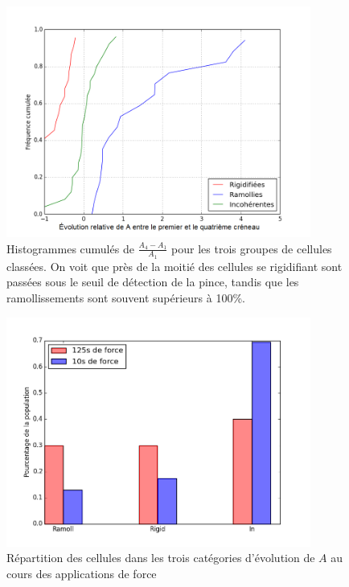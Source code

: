 \documentclass                                                                                                                                                                                                                                                                                                                                       {report}
\begin{document}
\begin{figure}[p]
\includegraphics[width=10cm]{Figures/Evolution_J4-J0_sur_J0.png} 
\caption{Histogrammes cumulés de $\frac{A_4-A_1}{A_1}$ pour les trois groupes de cellules classées. On voit que près de la moitié des cellules se rigidifiant sont passées sous le seuil de détection de la pince, tandis que les ramollissements sont souvent supérieurs à 100\%.  }
\end{figure}

\begin{figure}[p]
\includegraphics[width=10cm]{Figures/FRI_temoin_vs_C4.png} 
\caption{Répartition des cellules dans les trois catégories d'évolution de $A$ au cours des applications de force \label{FRI_temoin}}
\end{figure}
\end{document}
